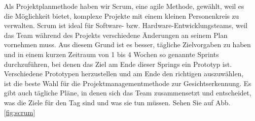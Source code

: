 Als Projektplanmethode haben wir Scrum, eine agile Methode, gewählt, weil es die Möglichkeit bietet, komplexe Projekte mit einem kleinen Personenkreis zu verwalten. Scrum ist ideal für Software- bzw. Hardware-Entwicklungsteams, weil das Team während des Projekts verschiedene Änderungen an seinem Plan vornehmen muss. Aus diesem Grund ist es besser, tägliche Zielvorgaben zu haben und in einem kurzen Zeitraum von 1 bis 4 Wochen so genannte Sprints durchzuführen, bei denen das Ziel am Ende dieser Springs ein Prototyp ist. Verschiedene Prototypen herzustellen und am Ende den richtigen auszuwählen, ist die beste Wahl für die Projektmanagementmethode zur Gesichtserkennung. Es gibt auch tägliche Pläne, in denen sich das Team zusammensetzt und entscheidet, was die Ziele für den Tag sind und was sie tun müssen. Sehen Sie auf Abb. \ref{fig:scrum}




